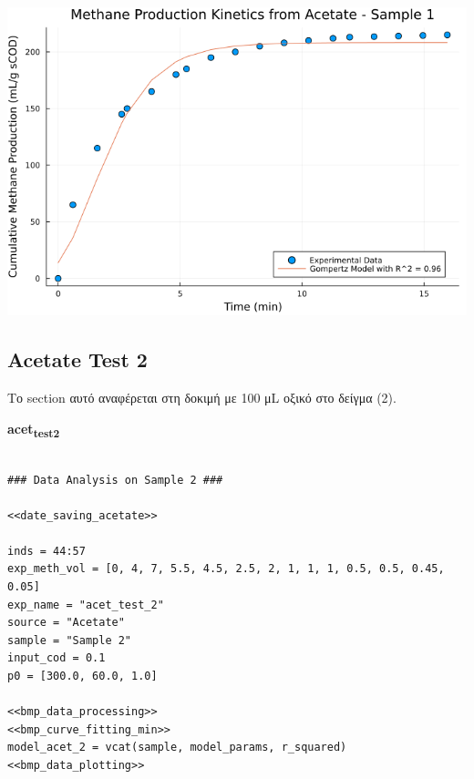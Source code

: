 \documentclass[11pt]{article}
\begin{document}
\begin{center}
\includegraphics[width=.9\linewidth]{../plots/BMPs/Acetate/methane_kinetics_acet_test_1.png}
\end{center}

\subsection{Acetate Test 2}
\label{sec:org7aee929}
Το section αυτό αναφέρεται στη δοκιμή με 100 μL οξικό στο δείγμα (2).

\textbf{acet\textsubscript{test}\textsubscript{2}}
\begin{verbatim}

### Data Analysis on Sample 2 ###

<<date_saving_acetate>>

inds = 44:57
exp_meth_vol = [0, 4, 7, 5.5, 4.5, 2.5, 2, 1, 1, 1, 0.5, 0.5, 0.45, 0.05]
exp_name = "acet_test_2"
source = "Acetate"
sample = "Sample 2"
input_cod = 0.1
p0 = [300.0, 60.0, 1.0]

<<bmp_data_processing>>
<<bmp_curve_fitting_min>>
model_acet_2 = vcat(sample, model_params, r_squared)
<<bmp_data_plotting>>
\end{verbatim}
\end{document}
